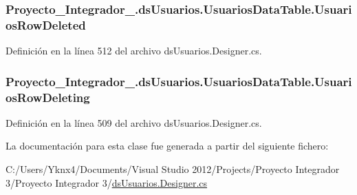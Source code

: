 \hypertarget{class_proyecto___integrador__3_1_1ds_usuarios_1_1_usuarios_data_table_a7f14b5c1917873a25cdaefc417fee6bc}{
\subsubsection[{Usuarios\-Row\-Deleted}]{ Proyecto\-\_\-\-Integrador\-\_.\-ds\-Usuarios.\-Usuarios\-Data\-Table.\-Usuarios\-Row\-Deleted}}\label{class_proyecto___integrador__3_1_1ds_usuarios_1_1_usuarios_data_table_a7f14b5c1917873a25cdaefc417fee6bc}


Definición en la línea 512 del archivo ds\-Usuarios.\-Designer.\-cs.

\hypertarget{class_proyecto___integrador__3_1_1ds_usuarios_1_1_usuarios_data_table_ac2f7f55347d3da57ae9769a7358f2ac6}{
\subsubsection[{Usuarios\-Row\-Deleting}]{ Proyecto\-\_\-\-Integrador\-\_.\-ds\-Usuarios.\-Usuarios\-Data\-Table.\-Usuarios\-Row\-Deleting}}\label{class_proyecto___integrador__3_1_1ds_usuarios_1_1_usuarios_data_table_ac2f7f55347d3da57ae9769a7358f2ac6}


Definición en la línea 509 del archivo ds\-Usuarios.\-Designer.\-cs.



La documentación para esta clase fue generada a partir del siguiente fichero\-:\begin{DoxyCompactItemize}
\item 
C\-:/\-Users/\-Yknx4/\-Documents/\-Visual Studio 2012/\-Projects/\-Proyecto Integrador 3/\-Proyecto Integrador 3/\hyperlink{ds_usuarios_8_designer_8cs}{ds\-Usuarios.\-Designer.\-cs}\end{DoxyCompactItemize}
